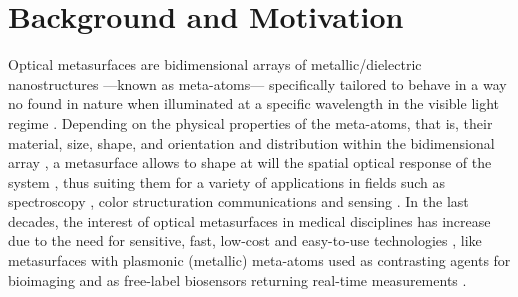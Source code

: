 
\chapter*{Background and Motivation}
\label{chapter:intro}



Optical metasurfaces are bidimensional arrays of metallic/dielectric nanostructures ---known as meta-atoms--- specifically tailored to behave in a way no found in nature when illuminated at a specific wavelength in the visible light regime \cite{khan_optical_2022,gonzalez-alcalde_large_2020}. Depending on the physical properties of the meta-atoms, that is, their material, size, shape, and orientation and distribution within the bidimensional array \cite{kim_plasmonic_2019,khan_optical_2022}, a metasurface  allows to shape at will the  spatial optical response of the system \cite{chen_review_2016}, thus suiting them for a variety of applications in fields such as spectroscopy \cite{khan_optical_2022}, color structuration \cite{gonzalez-alcalde_large_2020} communications \cite{chen_review_2016} and sensing \cite{estevez_trends_2014,jain_noble_2008,khan_optical_2022,chen_review_2016,kim_plasmonic_2019}. In the last decades, the interest of optical metasurfaces in medical disciplines has increase due to  the need for sensitive, fast, low-cost and easy-to-use technologies \cite{estevez_trends_2014,kim_plasmonic_2019}, like metasurfaces with plasmonic (metallic) meta-atoms used as contrasting agents for bioimaging  \cite{kim_plasmonic_2019} and as free-label biosensors returning real-time measurements \cite{estevez_trends_2014,kabashin_plasmonic_2009,khan_optical_2022}.

